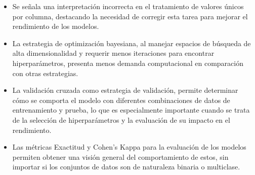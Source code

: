 \begin{itemize}
	\item Se señala una interpretación incorrecta en el tratamiento de valores únicos por columna, destacando la necesidad de corregir esta tarea para mejorar el rendimiento de los modelos.
	\item La estrategia de optimización bayesiana, al manejar espacios de búsqueda de alta dimensionalidad y requerir menos iteraciones para encontrar hiperparámetros, presenta menos demanda computacional en comparación con otras estrategias.
	\item La validación cruzada como estrategia de validación, permite determinar cómo se comporta el modelo con diferentes combinaciones de datos de entrenamiento y prueba, lo que es especialmente importante cuando se trata de la selección de hiperparámetros y la evaluación de su impacto en el rendimiento.
	\item Las métricas Exactitud y Cohen's Kappa para la evaluación de los modelos permiten obtener una visión general del comportamiento de estos, sin importar si los conjuntos de datos son de naturaleza binaria o multiclase.
\end{itemize}













\pagebreak
